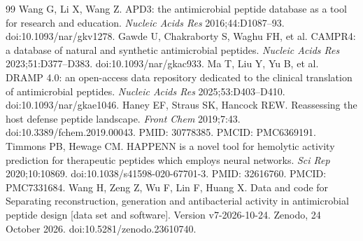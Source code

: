\documentclass[unnumsec,webpdf,contemporary,large]{oup-authoring-template}
\begin{document}
\begin{thebibliography}{99}
 Wang G, Li X, Wang Z. APD3: the antimicrobial peptide database as a tool for research and education. \textit{Nucleic Acids Res} 2016;44:D1087--93. doi:10.1093/nar/gkv1278.
 Gawde U, Chakraborty S, Waghu FH, et al. CAMPR4: a database of natural and synthetic antimicrobial peptides. \textit{Nucleic Acids Res} 2023;51:D377--D383. doi:10.1093/nar/gkac933.
 Ma T, Liu Y, Yu B, et al. DRAMP 4.0: an open-access data repository dedicated to the clinical translation of antimicrobial peptides. \textit{Nucleic Acids Res} 2025;53:D403--D410. doi:10.1093/nar/gkae1046.
 Haney EF, Straus SK, Hancock REW. Reassessing the host defense peptide landscape. \textit{Front Chem} 2019;7:43. doi:10.3389/fchem.2019.00043. PMID: 30778385. PMCID: PMC6369191.
 Timmons PB, Hewage CM. HAPPENN is a novel tool for hemolytic activity prediction for therapeutic peptides which employs neural networks. \textit{Sci Rep} 2020;10:10869. doi:10.1038/s41598-020-67701-3. PMID: 32616760. PMCID: PMC7331684.
 Wang H, Zeng Z, Wu F, Lin F, Huang X. Data and code for Separating reconstruction, generation and antibacterial activity in antimicrobial peptide design [data set and software]. Version v7-2026-10-24. Zenodo, 24 October 2026. doi:10.5281/zenodo.23610740.
\end{thebibliography}
\end{document}
